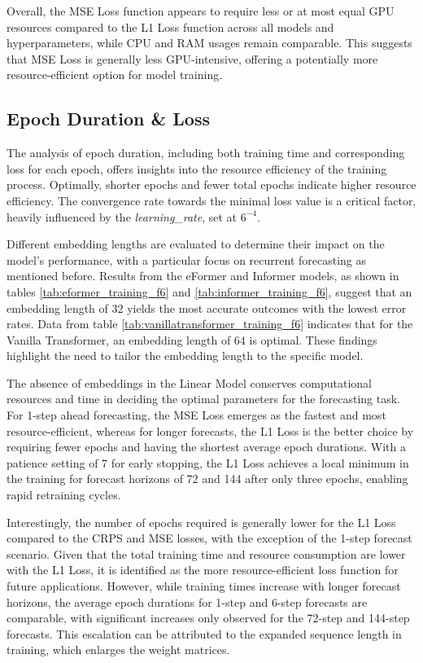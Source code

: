 \documentclass{article}
\begin{document}
Overall, the MSE Loss function appears to require less or at most equal GPU resources compared to the L1 Loss function across all models and hyperparameters, while CPU and RAM usages remain comparable. This suggests that MSE Loss is generally less GPU-intensive, offering a potentially more resource-efficient option for model training.


\subsection{Epoch Duration \& Loss}

The analysis of epoch duration, including both training time and corresponding loss for each epoch, offers insights into the resource efficiency of the training process. Optimally, shorter epochs and fewer total epochs indicate higher resource efficiency. The convergence rate towards the minimal loss value is a critical factor, heavily influenced by the \textit{learning\_rate}, set at $6^{-4}$.

Different embedding lengths are evaluated to determine their impact on the model's performance, with a particular focus on recurrent forecasting as mentioned before. Results from the eFormer and Informer models, as shown in tables \ref{tab:eformer_training_f6} and \ref{tab:informer_training_f6}, suggest that an embedding length of $32$ yields the most accurate outcomes with the lowest error rates. Data from table \ref{tab:vanillatransformer_training_f6} indicates that for the Vanilla Transformer, an embedding length of $64$ is optimal. These findings highlight the need to tailor the embedding length to the specific model.

The absence of embeddings in the Linear Model conserves computational resources and time in deciding the optimal parameters for the forecasting task. For 1-step ahead forecasting, the MSE Loss emerges as the fastest and most resource-efficient, whereas for longer forecasts, the L1 Loss is the better choice by requiring fewer epochs and having the shortest average epoch durations. With a patience setting of 7 for early stopping, the L1 Loss achieves a local minimum in the training for forecast horizons of 72 and 144 after only three epochs, enabling rapid retraining cycles.

Interestingly, the number of epochs required is generally lower for the L1 Loss compared to the CRPS and MSE losses, with the exception of the 1-step forecast scenario. Given that the total training time and resource consumption are lower with the L1 Loss, it is identified as the more resource-efficient loss function for future applications. However, while training times increase with longer forecast horizons, the average epoch durations for 1-step and 6-step forecasts are comparable, with significant increases only observed for the 72-step and 144-step forecasts. This escalation can be attributed to the expanded sequence length in training, which enlarges the weight matrices.
\end{document}
